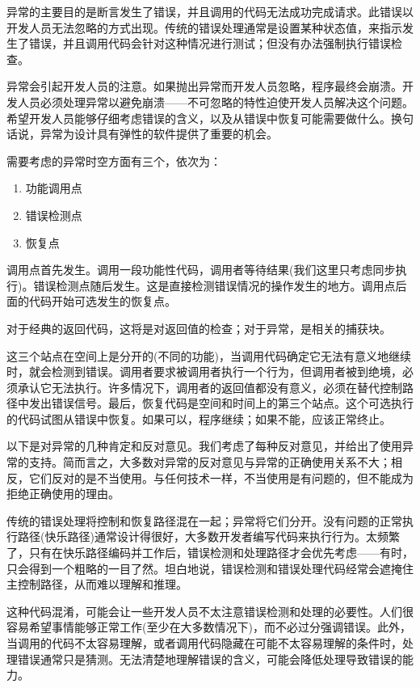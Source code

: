 
异常的主要目的是断言发生了错误，并且调用的代码无法成功完成请求。此错误以开发人员无法忽略的方式出现。传统的错误处理通常是设置某种状态值，来指示发生了错误，并且调用代码会针对这种情况进行测试；但没有办法强制执行错误检查。

异常会引起开发人员的注意。如果抛出异常而开发人员忽略，程序最终会崩溃。开发人员必须处理异常以避免崩溃——不可忽略的特性迫使开发人员解决这个问题。希望开发人员能够仔细考虑错误的含义，以及从错误中恢复可能需要做什么。换句话说，异常为设计具有弹性的软件提供了重要的机会。

需要考虑的异常时空方面有三个，依次为：

\begin{enumerate}
\item
功能调用点

\item
错误检测点

\item
恢复点
\end{enumerate}

调用点首先发生。调用一段功能性代码，调用者等待结果(我们这里只考虑同步执行)。错误检测点随后发生。这是直接检测错误情况的操作发生的地方。调用点后面的代码开始可选发生的恢复点。

对于经典的返回代码，这将是对返回值的检查；对于异常，是相关的捕获块。

这三个站点在空间上是分开的(不同的功能)，当调用代码确定它无法有意义地继续时，就会检测到错误。调用者要求被调用者执行一个行为，但调用者被到绝境，必须承认它无法执行。许多情况下，调用者的返回值都没有意义，必须在替代控制路径中发出错误信号。最后，恢复代码是空间和时间上的第三个站点。这个可选执行的代码试图从错误中恢复。如果可以，程序继续；如果不能，应该正常终止。

以下是对异常的几种肯定和反对意见。我们考虑了每种反对意见，并给出了使用异常的支持。简而言之，大多数对异常的反对意见与异常的正确使用关系不大；相反，它们反对的是不当使用。与任何技术一样，不当使用是有问题的，但不能成为拒绝正确使用的理由。


传统的错误处理将控制和恢复路径混在一起；异常将它们分开。没有问题的正常执行路径(快乐路径)通常设计得很好，大多数开发者编写代码来执行行为。太频繁了，只有在快乐路径编码并工作后，错误检测和处理路径才会优先考虑——有时，只会得到一个粗略的一目了然。坦白地说，错误检测和错误处理代码经常会遮掩住主控制路径，从而难以理解和推理。

这种代码混淆，可能会让一些开发人员不太注意错误检测和处理的必要性。人们很容易希望事情能够正常工作(至少在大多数情况下)，而不必过分强调错误。此外，当调用的代码不太容易理解，或者调用代码隐藏在可能不太容易理解的条件时，处理错误通常只是猜测。无法清楚地理解错误的含义，可能会降低处理导致错误的能力。


